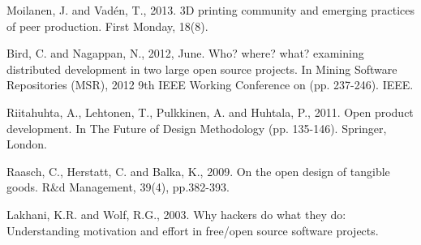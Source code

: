 Moilanen, J. and Vadén, T., 2013. 3D printing community and emerging practices of peer production. First Monday, 18(8).





Bird, C. and Nagappan, N., 2012, June. Who? where? what? examining distributed development in two large open source projects. In Mining Software Repositories (MSR), 2012 9th IEEE Working Conference on (pp. 237-246). IEEE.


Riitahuhta, A., Lehtonen, T., Pulkkinen, A. and Huhtala, P., 2011. Open product development. In The Future of Design Methodology (pp. 135-146). Springer, London.


Raasch, C., Herstatt, C. and Balka, K., 2009. On the open design of tangible goods. R&d Management, 39(4), pp.382-393.


Lakhani, K.R. and Wolf, R.G., 2003. Why hackers do what they do: Understanding motivation and effort in free/open source software projects.
